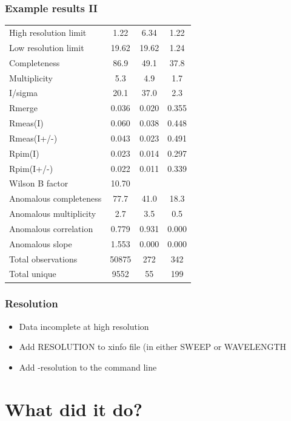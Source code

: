 \documentclass[slides,compress]{beamer}
\begin{document}
\begin{frame}
\frametitle{Example results II}
\begin{tabular}{lccc}
High resolution limit         &         1.22 &  6.34 &  1.22 \\
Low resolution limit          &        19.62 & 19.62 &  1.24 \\
Completeness                  &         86.9 &  49.1 &  37.8 \\
Multiplicity                  &        5.3  &  4.9   & 1.7 \\
I/sigma                       &        20.1 &  37.0  &  2.3 \\
Rmerge                        &       0.036 & 0.020  &0.355 \\
Rmeas(I)                      &       0.060 & 0.038  &0.448 \\
Rmeas(I+/-)                   &       0.043 & 0.023  &0.491 \\
Rpim(I)                       &       0.023 & 0.014  &0.297 \\
Rpim(I+/-)                    &       0.022 & 0.011  &0.339 \\
Wilson B factor               &       10.70& \\
Anomalous completeness        &        77.7  & 41.0  & 18.3 \\
Anomalous multiplicity        &         2.7  &  3.5  &  0.5 \\
Anomalous correlation         &        0.779 & 0.931 & 0.000 \\
Anomalous slope               &       1.553  &0.000 & 0.000 \\
Total observations            &       50875  &272   & 342 \\
Total unique                  &       9552   &55    & 199 \\
\end{tabular}
\end{frame}

\begin{frame}
\frametitle{Resolution}
\begin{itemize}
\item{Data incomplete at high resolution}
\item{Add RESOLUTION to xinfo file (in either SWEEP or WAVELENGTH}
\item{Add -resolution to the command line}
\end{itemize}
\end{frame}

\section{What did it do?}
\end{document}
